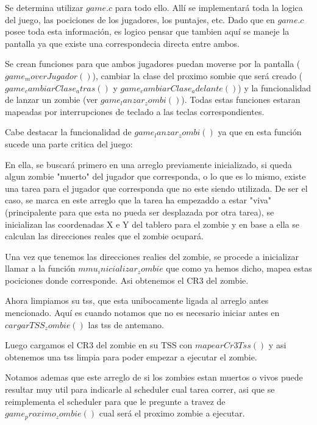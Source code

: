 \documentclass[a4paper]{article}
\begin{document}
Se determina utilizar $game.c$ para todo ello. Allí se implementará toda la logica del juego, las pociciones de los jugadores, los puntajes, etc. Dado que en $game.c$ posee toda esta información, es logico pensar que tambien aquí se maneje la pantalla ya que existe una correspondecia directa entre ambos.

Se crean funciones para que ambos jugadores puedan moverse por la pantalla ($game_moverJugador()$), cambiar la clase del proximo sombie que será creado ($game_cambiarClase_atras()$ y $game_cambiarClase_adelante()$) y la funcionalidad de lanzar un zombie (ver $game_lanzar_zombi()$). Todas estas funciones estaran mapeadas por interrupciones de teclado a las teclas correspondientes.

Cabe destacar la funcionalidad de $game_lanzar_zombi()$ ya que en esta función sucede una parte critica del juego:

En ella, se buscará primero en una arreglo previamente inicializado, si queda algun zombie "muerto" del jugador que corresponda, o lo que es lo mismo, existe una tarea para el jugador que corresponda que no este siendo utilizada. De ser el caso, se marca en este arreglo que la tarea ha empezaddo a estar "viva" (principalente para que esta no pueda ser desplazada por otra tarea), se inicializan las coordenadas X e Y del tablero para el zombie y en base a ella se calculan las direcciones reales que el zombie ocupará.

Una vez que tenemos las direcciones realies del zombie, se procede a inicializar llamar a la función $mmu_inicializar_zombie$ que como ya hemos dicho, mapea estas pociciones donde corresponde. Asi obtenemos el CR3 del zombie.

Ahora limpiamos su tss, que esta unibocamente ligada al arreglo antes mencionado. Aquí es cuando notamos que no es necesario iniciar antes en $cargarTSS_zombie()$ las tss de antemano.

Luego cargamos el CR3 del zombie en su TSS con $mapearCr3Tss()$ y asi obtenemos una tss limpia para poder empezar a ejecutar el zombie.

Notamos ademas que este arreglo de si los zombies estan muertos o vivos puede resultar muy util para indicarle al scheduler cual tarea correr, asi que se reimplementa el scheduler para que le pregunte a travez de $game_proximo_zombie()$ cual será el proximo zombie a ejecutar.
\end{document}
